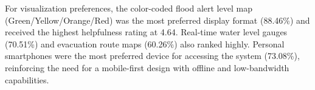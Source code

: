 \documentclass{research}
\begin{document}
For visualization preferences, the color-coded flood alert level map
(Green/Yellow/Orange/Red) was the most preferred display format (88.46\%) and
received the highest helpfulness rating at 4.64. Real-time water level gauges (70.51\%)
and evacuation route maps (60.26\%) also ranked highly. Personal smartphones were the
most preferred device for accessing the system (73.08\%), reinforcing the need for a
mobile-first design with offline and low-bandwidth capabilities.

\printbibliography

\clearpage


\end{document}
